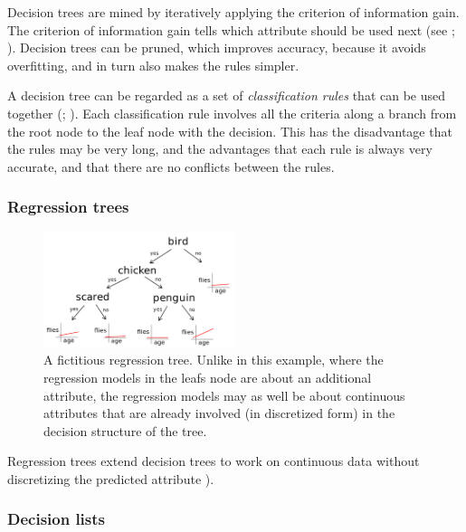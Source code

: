 Decision trees are mined by iteratively applying the criterion of information gain. The criterion of information gain tells which attribute should be used next (see \citet[ch.~18.3]{russellArtificialIntelligenceModern2010}; \citet[ch.~4.3]{wittenDataMiningPractical2017}). Decision trees can be pruned, which improves accuracy, because it avoids overfitting, and in turn also makes the rules simpler. 

A decision tree can be regarded as a set of \textit{classification rules} that can be used together (\citet[ch.~3.4]{wittenDataMiningPractical2017}; \citet[p.~358]{hanDataMiningConcepts2011}). Each classification rule involves all the criteria along a branch from the root node to the leaf node with the decision. This has the disadvantage that the rules may be very long, and the advantages that each rule is always very accurate, and that there are no conflicts between the rules.

\subsubsection{Regression trees}

\begin{figure}[htb]
        \centering
        \includegraphics[width=0.5\textwidth]{images/regression-tree.png}
        \caption{A fictitious regression tree. Unlike in this example, where the regression models in the leafs node are about an additional attribute, the regression models may as well be about continuous attributes that are already involved (in discretized form) in the decision structure of the tree.}
        \label{fig:regression-list}
\end{figure}

Regression trees extend decision trees to work on continuous data without discretizing the predicted attribute \citep[p.~72ff.]{wittenDataMiningPractical2017}).

\subsubsection{Decision lists}\label{sec:decision-lists}

